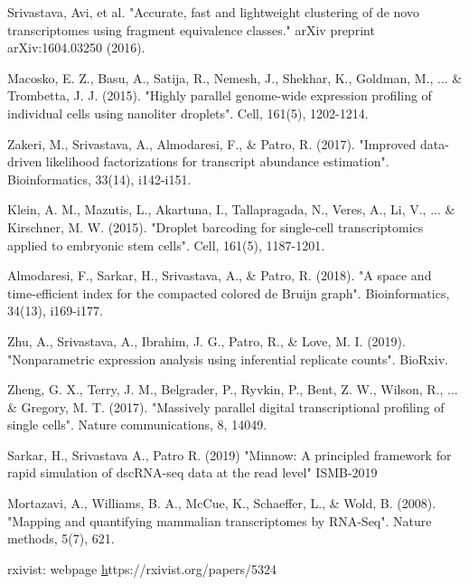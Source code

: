 \documentclass[11pt,a4paper,sans]{moderncv} %
\begin{document}
\begin{thebibliography}{1}
 Srivastava, Avi, et al. 
"Accurate, fast and lightweight clustering of de novo transcriptomes using fragment equivalence classes." 
arXiv preprint arXiv:1604.03250 (2016).

 Macosko, E. Z., Basu, A., Satija, R., Nemesh, J., Shekhar, K., Goldman, M., ... \& Trombetta, J. J. (2015). 
"Highly parallel genome-wide expression profiling of individual cells using nanoliter droplets". 
Cell, 161(5), 1202-1214.

 Zakeri, M., Srivastava, A., Almodaresi, F., \& Patro, R. (2017). 
"Improved data-driven likelihood factorizations for transcript abundance estimation". 
Bioinformatics, 33(14), i142-i151.

 Klein, A. M., Mazutis, L., Akartuna, I., Tallapragada, N., Veres, A., Li, V., ... \& Kirschner, M. W. (2015). 
"Droplet barcoding for single-cell transcriptomics applied to embryonic stem cells". 
Cell, 161(5), 1187-1201.

 Almodaresi, F., Sarkar, H., Srivastava, A., \& Patro, R. (2018). 
"A space and time-efficient index for the compacted colored de Bruijn graph".
Bioinformatics, 34(13), i169-i177.

 Zhu, A., Srivastava, A., Ibrahim, J. G., Patro, R., \& Love, M. I. (2019). 
"Nonparametric expression analysis using inferential replicate counts". BioRxiv.

 Zheng, G. X., Terry, J. M., Belgrader, P., Ryvkin, P., Bent, Z. W., Wilson, R., ... \& Gregory, M. T. (2017). 
"Massively parallel digital transcriptional profiling of single cells". Nature communications, 8, 14049.

 Sarkar, H., Srivastava A., Patro R. (2019)
"Minnow: A principled framework for rapid simulation of dscRNA-seq data at the read level"
ISMB-2019

 Mortazavi, A., Williams, B. A., McCue, K., Schaeffer, L., \& Wold, B. (2008). 
"Mapping and quantifying mammalian transcriptomes by RNA-Seq". 
Nature methods, 5(7), 621.

 {rxivist: webpage} 
{\href{https://rxivist.org/papers/5324} https://rxivist.org/papers/5324}

\end{thebibliography}
\end{document}
